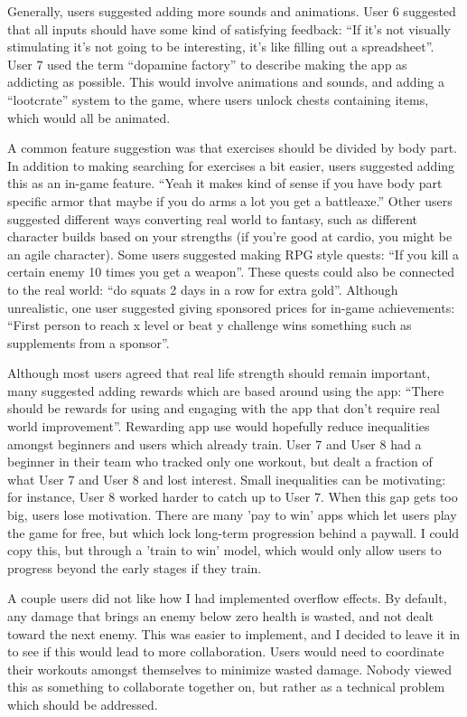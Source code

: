 \documentclass{l4proj}
\begin{document}
Generally, users suggested adding more sounds and animations. User 6 suggested that all inputs should have some kind of satisfying feedback: ``If it's not visually stimulating it's not going to be interesting, it's like filling out a spreadsheet''. User 7 used the term ``dopamine factory'' to describe making the app as addicting as possible. This would involve animations and sounds, and adding a ``lootcrate'' system to the game, where users unlock chests containing items, which would all be animated. 

A common feature suggestion was that exercises should be divided by body part. In addition to making searching for exercises a bit easier, users suggested adding this as an in-game feature. ``Yeah it makes kind of sense if you have body part specific armor that maybe if you do arms a lot you get a battleaxe.'' Other users suggested different ways converting real world to fantasy, such as different character builds based on your strengths (if you're good at cardio, you might be an agile character). Some users suggested making RPG style quests: ``If you kill a certain enemy 10 times you get a weapon''. These quests could also be connected to the real world: ``do squats 2 days in a row for extra gold''. Although unrealistic, one user suggested giving sponsored prices for in-game achievements: ``First person to reach x level or beat y challenge wins something such as supplements from a sponsor''.

Although most users agreed that real life strength should remain important, many suggested adding rewards which are based around using the app: ``There should be rewards for using and engaging with the app that don't require real world improvement''. Rewarding app use would hopefully reduce inequalities amongst beginners and users which already train.  User 7 and User 8 had a beginner in their team who tracked only one workout, but dealt a fraction of what User 7 and User 8 and lost interest. Small inequalities can be motivating: for instance, User 8 worked harder to catch up to User 7. When this gap gets too big, users lose motivation. There are many 'pay to win' apps which let users play the game for free, but which lock long-term progression behind a paywall. I could copy this, but through a 'train to win' model, which would only allow users to progress beyond the early stages if they train. 

A couple users did not like how I had implemented overflow effects. By default, any damage that brings an enemy below zero health is wasted, and not dealt toward the next enemy. This was easier to implement, and I decided to leave it in to see if this would lead to more collaboration. Users would need to coordinate their workouts amongst themselves to minimize wasted damage. Nobody viewed this as something to collaborate together on, but rather as a technical problem which should be addressed.
\end{document}
